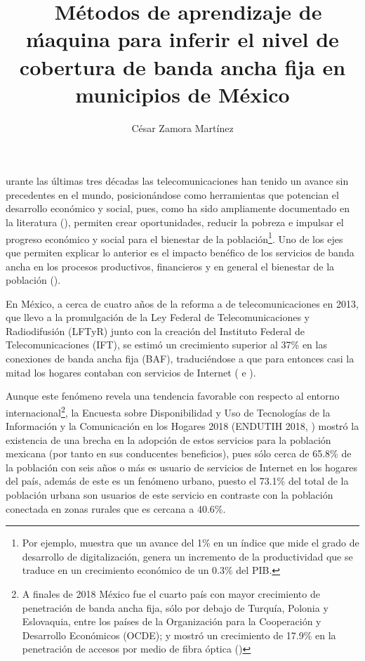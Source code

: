 \documentclass[9pt,twocolumn,twoside]{ilcss}
\title{\ M\'etodos de aprendizaje de \'maquina para inferir el nivel de cobertura de banda ancha fija en municipios  de M\'exico}
\author[a]{C\'esar Zamora Mart\'inez}
\affil[a]{Alumno de Maestr\'ia en Ciencias de Datos (ITAM)}
\begin{document}
\maketitle
\thispagestyle{firststyle}


urante las últimas tres décadas las telecomunicaciones han tenido un avance sin precedentes en el mundo, posicionándose como herramientas que potencian el desarrollo económico y social, pues, como ha sido ampliamente documentado en la literatura (\cite{PRADHAN2014634}), permiten crear oportunidades, reducir la pobreza e impulsar el progreso económico y social para el bienestar de la población\footnote{Por ejemplo, \cite{Katz2018} muestra que un avance del 1\% en un índice que mide el grado de desarrollo de digitalización, genera un incremento de la productividad que se traduce en un crecimiento económico de un 0.3\% del PIB. }. Uno de los ejes que permiten explicar lo anterior es el impacto benéfico de los servicios de banda ancha en los procesos productivos, financieros y en general el bienestar de la población (\cite{Katz2012}).

En México, a cerca de cuatro años de la reforma a de telecomunicaciones en 2013, que llevo a la promulgación de la Ley Federal de Telecomunicaciones y Radiodifusión (LFTyR) junto con la creación del Instituto Federal de Telecomunicaciones (IFT), se estimó un crecimiento superior al 37\% en las conexiones de banda ancha fija (BAF), traduciéndose a que para entonces casi la mitad los hogares contaban con servicios de Internet (\cite{IFT2017} e \cite{IFT2018}).

Aunque este fenómeno revela una tendencia favorable con respecto al entorno internacional\footnote{A finales de 2018 México fue el cuarto país con mayor crecimiento de penetración de banda ancha fija, sólo por debajo de Turquía, Polonia y Eslovaquia, entre los países de la Organización para la Cooperación y Desarrollo Económicos (OCDE); y mostró un crecimiento de 17.9\% en la penetración de accesos por medio de fibra óptica (\cite{IFT2019})}, la Encuesta sobre Disponibilidad y Uso de Tecnologías de la Información y la Comunicación en los Hogares 2018 (ENDUTIH 2018, \cite{ENDUTIH2018}) mostró la existencia de una brecha en la adopción de estos servicios para la población mexicana (por tanto en sus conducentes beneficios), pues sólo cerca de 65.8\% de la población con seis años o más es usuario de servicios de Internet en los hogares del país, además de este es un fenómeno urbano, puesto el 73.1\% del total de la población urbana son usuarios de este servicio en contraste con la población conectada en zonas rurales que es cercana a 40.6\%.
\end{document}
